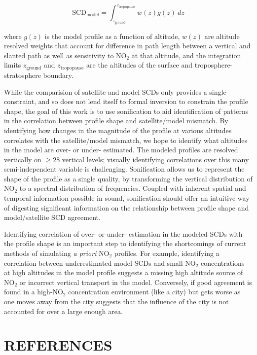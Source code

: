\documentclass[a4paper,10pt,oneside]{article}
\newcommand{\ce}[1]{$\mathrm{#1}$}
\begin{document}
\begin{sloppy}
\begin{equation}
\mathrm{SCD_{model}} = \int_{z_{\mathrm{ground}}}^{z_{\mathrm{tropopause}}} w(z) g(z) \: dz
\label{eqn:scd-model}
\end{equation}

where $g(z)$ is the model profile as a function of altitude, $w(z)$ are altitude resolved weights that account for difference in path length between a vertical and slanted path as well as sensitivity to \ce{NO_2} at that altitude, and the integration limits $z_{\mathrm{ground}}$ and $z_{\mathrm{tropopause}}$ are the altitudes of the surface and troposphere-stratosphere boundary.

	While the comparision of satellite and model SCDs only provides a single constraint, and so does not lend itself to formal inversion to constrain the profile shape, the goal of this work is to use sonification to aid identification of patterns in the correlation between profile shape and satellite/model mismatch. By identifying how changes in the magnitude of the profile at various altitudes correlates with the satellite/model mismatch, we hope to identify what altitudes in the model are over- or under- estimated. The modeled profiles are resolved vertically on $\geq 28$ vertical levels; visually identifying correlations over this many semi-independent variable is challenging. Sonification allows us to represent the shape of the profile as a single quality, by transforming the vertical distribution of \ce{NO_2} to a spectral distribution of frequencies. Coupled with inherent spatial and temporal information possible in sound, sonification should offer an intuitive way of digesting significant information on the relationship between profile shape and model/satellite SCD agreement.

	Identifying correlation of over- or under- estimation in the modeled SCDs with the profile shape is an important step to identifying the shortcomings of current methods of simulating \emph{a priori} \ce{NO_2} profiles.  For example, identifying a correlation between underestimated model SCDs and small \ce{NO_2} concentrations at high altitudes in the model profile suggests a missing high altitude source of \ce{NO_2} or incorrect vertical transport in the model. Conversely, if good agreement is found in a high-\ce{NO_2} concentration environment (like a city) but gets worse as one moves away from the city suggests that the influence of the city is not accounted for over a large enough area.


\section{REFERENCES}
\label{sec:ref}



\end{sloppy}
\end{document}
